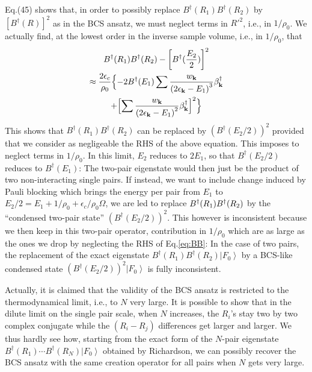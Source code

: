 \documentclass[aps,prb,superscriptaddress,showpacs,reprint,lengthcheck]{revtex4-1}
\newcommand{\vk}{\ensuremath{\mathbf{k}}}
\begin{document}
Eq.(45) shows that, in order to possibly replace $B^{\dagger}(R_1)B^{\dagger}(R_2)$ by $\left[B^{\dagger}(R)\right]
^2$ as in the BCS ansatz, we must neglect terms in $R'^2$, i.e., in $1/\rho_0$. We  actually find, at the lowest order in the inverse sample volume, i.e., in $1/\rho_0$, that
\begin{multline}  \label{eq:BB}
B^{\dagger}(R_1)B^{\dagger}(R_2)-\left[B^{\dagger}(\frac{E _2}{2})%
\right] ^2 \\
\approx \frac{2\epsilon_c}{\rho_0}\Bigl\{-2B^{\dagger}(E _1)\sum\frac{w_\vk}{\left(2\epsilon_\vk-%
E _1\right) ^3}\beta^{\dagger}_\vk\\ +\Bigl[\sum\frac{w_\vk}{%
\left(2\epsilon_\vk-E _1\right) ^2}\beta^{\dagger}_\vk\Bigr]
^2\Bigr\}  
\end{multline}
This shows that $B^{\dagger}(R_1)B^{\dagger}(R_2)$ can be
replaced by $\left(B^{\dagger}(E _2/2)\right) ^2$ provided that we
consider as negligeable the RHS of the above equation. This imposes to neglect terms in $1/\rho_0$. 
In this limit, $E_2$ reduces to $2E_1$, so that $B^{\dagger}(E _2/2)$  reduces to $%
B^{\dagger}(E _1)$: The
two-pair eigenstate would then just be the product of two non-interacting single pairs. If
instead, we want to include
change induced by Pauli blocking which brings the
energy per pair from $E _1$ to $E _2/2=E
_1+1/\rho_0+\epsilon_c/\rho_0\Omega$, we are led to replace $B^{\dagger}(R_1)B^{%
\dagger}(R_2)$ by the ``condensed two-pair state'' $\left(B^{\dagger}(E _2/2)\right) ^2$. This
however is inconsistent because we then keep in this two-pair
operator, contribution in $1/\rho_0$ which are as large as the ones we drop
by neglecting the RHS of Eq.\eqref{eq:BB}: In the case of two pairs, the replacement of
the exact eigenstate $B^{\dagger}(R_1)B^{\dagger}(R_2)\left|F_0\right>  $ by
a BCS-like condensed state $\left(B^{\dagger}(E _2/2)\right)
^2\left|F_0\right>  $ is fully inconsistent.

Actually, it is claimed that the validity of the BCS ansatz is restricted to the thermodynamical
limit, i.e., to $N$ very large. It is possible to show that in the dilute limit on the single pair scale, when $N$ increases, the $R_i$'s stay two by two complex conjugate while the $(R_i - R_j)$ differences get larger and larger. We thus hardly see how, 
starting from the exact form of the $N$-pair eigenstate $B^{\dagger}(R_1)\cdots{}B^{\dagger}(R_N)\left|F_0\right>  $ 
obtained by Richardson, we can possibly recover the BCS ansatz with the same 
creation operator for all  pairs when $N$ gets very large.
\end{document}
